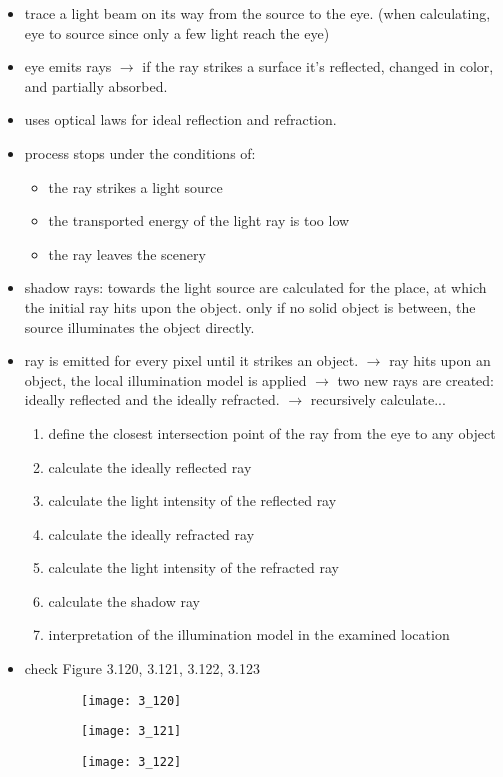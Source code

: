 \documentclass{standalone}
\begin{document}
\begin{itemize}
	\item trace a light beam on its way from the source to the eye. (when calculating, eye to source since only a few light reach the eye)
	\item eye emits rays $\rightarrow$ if the ray strikes a surface it's reflected, changed in color, and partially absorbed. 
	\item uses optical laws for ideal reflection and refraction. 
	\item process stops under the conditions of:
		\begin{itemize}
			\item the ray strikes a light source
			\item the transported energy of the light ray is too low
			\item the ray leaves the scenery
		\end{itemize}
	\item shadow rays: towards the light source are calculated for the place, at which the initial ray hits upon the object. only if no solid object is between, the source illuminates the object directly.
	\item ray is emitted for every pixel until it strikes an object. $\rightarrow$ ray hits upon an object, the local illumination model is applied $\rightarrow$ two new rays are created: ideally reflected and the ideally refracted. $\rightarrow$ recursively calculate...
		\begin{enumerate}
			\item define the closest intersection point of the ray from the eye to any object
			\item calculate the ideally reflected ray
			\item calculate the light intensity of the reflected ray
			\item calculate the ideally refracted ray
			\item calculate the light intensity of the refracted ray
			\item calculate the shadow ray 
			\item interpretation of the illumination model in the examined location
		\end{enumerate}
	\item check Figure 3.120, 3.121, 3.122, 3.123
\end{itemize}

\begin{figure}[H]
	\centering
	\begin{subfigure}[b]{0.3\textwidth}
		\texttt{[image: 3\_120]}
	\end{subfigure}
	\begin{subfigure}[b]{0.3\textwidth}
		\texttt{[image: 3\_121]}
	\end{subfigure}
	\begin{subfigure}[b]{0.3\textwidth}
		\texttt{[image: 3\_122]}
	\end{subfigure}
\end{figure}
\end{document}
